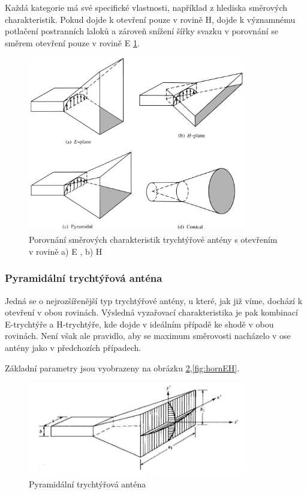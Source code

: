 Každá kategorie má své specifické vlastnosti, například z hlediska směrových charakteristik. Pokud dojde k otevření pouze v rovině H, dojde k významnému potlačení postranních laloků a zároveň snížení šířky svazku v porovnání se směrem otevření pouze v rovině E \ref{fig:hornComp}.

\begin{figure}[h]
\begin{center}
\includegraphics[width=9.5cm]{pics/HornTypes}
\caption{Porovnání směrových charakteristik trychtýřové antény s otevřením v rovině a) E , b) H \cite{ConstantineTheory}}
\label{fig:hornComp}
\end{center}
\end{figure}

\subsubsection{Pyramidální trychtýřová anténa}
Jedná se o nejrozšířenější typ trychtýřové antény, u které, jak již víme, dochází k otevření v obou rovinách. Výsledná vyzařovací charakteristika je pak kombinací E-trychtýře a H-trychtýře, kde dojde v ideálním případě ke shodě v obou rovinách. Není však ale pravidlo, aby se maximum směrovosti nacházelo v ose antény jako v předchozích případech.

Základní parametry jsou vyobrazeny na obrázku \ref{fig:horn},\ref{fig:hornEH}.

\begin{figure}[h]
\begin{center}
\includegraphics[width=9.5cm]{pics/horn}
\caption{Pyramidální trychtýřová anténa \cite{ConstantineTheory}}
\label{fig:horn}
\end{center}
\end{figure}

